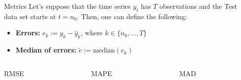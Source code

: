 \documentclass[usenames,dvipsnames]{beamer} %
\begin{document}
\begin{frame}{Metrics}
	\vfill	
	Let's suppose that the time series $y_t$ has $T$ observations and the 
	Test data set starts at $t = n_0$. Then, one can define the following:
	
	\vfill
	\begin{itemize}
		\item \textbf{Errors:} $e_k := y_k - \widehat{y}_k$, where $k \in 
		\{n_0, \ldots, T\}$
		
		\item \textbf{Median of errors:} 
		$\widetilde{e} := \text{median}(e_k)$
	\end{itemize}
	
	\vfill
	\begin{columns}
	\begin{column}{.3\textwidth}
	\begin{block}{\centering RMSE}
		\centering
	\end{block}
	\end{column}
	
	\begin{column}{.3\textwidth}
	\begin{block}{\centering MAPE}
	\vspace{.12cm}
		\centering
	\vspace{.12cm}
	\end{block}
	\end{column}
	
	\begin{column}{.3\textwidth}
	\begin{block}{\centering MAD}
	\vspace{.43cm}
		\centering
	\vspace{.43cm}	
	\end{block}				
	\end{column}
	\end{columns}
\end{frame}
\end{document}
